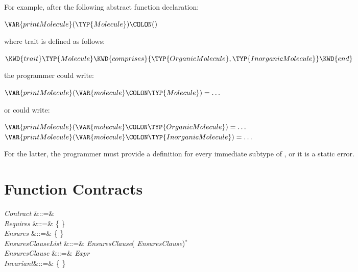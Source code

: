For example, after the following abstract function declaration:
\begin{Fortress}
\(\VAR{printMolecule}(\TYP{Molecule})\COLON ()\)
\end{Fortress}
where trait  is defined as follows:
\begin{Fortress}
\(\KWD{trait} \TYP{Molecule} \KWD{comprises} \{\TYP{OrganicMolecule}, \TYP{InorganicMolecule}\} \KWD{end}\)
\end{Fortress}
the programmer could write:
\begin{Fortress}
\(\VAR{printMolecule}(\VAR{molecule}\COLON \TYP{Molecule}) = \ldots\)
\end{Fortress}
or could write:
\begin{Fortress}
\(\VAR{printMolecule}(\VAR{molecule}\COLON \TYP{OrganicMolecule}) = \ldots\)\\
\(\VAR{printMolecule}(\VAR{molecule}\COLON \TYP{InorganicMolecule}) = \ldots\)
\end{Fortress}
For the latter, the programmer must provide a
definition for every immediate subtype of , or
it is a static error.

\section{Function Contracts}


\begin{Grammar}
\emph{Contract} &::=&   \\

\emph{Requires} &::=&
 \{  \} \\

\emph{Ensures}  &::=&
 \{  \} \\

\emph{EnsuresClauseList} &::=&
\emph{EnsuresClause}(\EXP{,} \emph{EnsuresClause})$^*$ \\

\emph{EnsuresClause} &::=& \emph{Expr}  \\

\emph{Invariant}&::=&
 \{  \} \\

\end{Grammar}

